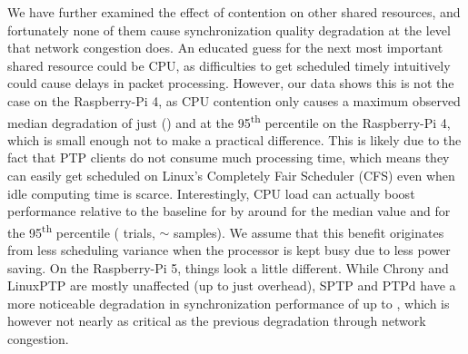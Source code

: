 We have  further examined the effect of contention on other shared resources, and fortunately none of them cause synchronization quality degradation at the level that network congestion does.
An educated guess for the next most important shared resource could be CPU, as difficulties to get scheduled timely intuitively could cause delays in packet processing.
However, our data shows this is not the case on the Raspberry-Pi 4, as CPU contention only causes a maximum observed median degradation of just \fRelative{\cmpMax} (\fVendor{\cmpMaxArg}) and \fRelative{\cmpMax} at the 95\textsuperscript{th} percentile on the Raspberry-Pi 4, which is small enough not to make a practical difference.
This is likely due to the fact that PTP clients do not consume much processing time, which means they can easily get scheduled on Linux's Completely Fair Scheduler (CFS) even when idle computing time is scarce.
Interestingly, CPU load can actually boost performance relative to the baseline for \fVendor{\cmpMinArg} by around \fRelativeInverted{\cmpMin} for the median value and \fRelativeInverted{\cmpMin} for the 95\textsuperscript{th} percentile ( trials, $\sim$ samples).
%
%
We assume that this benefit originates from less scheduling variance when the processor is kept busy due to less power saving.
%
%
On the Raspberry-Pi 5, things look a little different. While Chrony and LinuxPTP are mostly unaffected (up to just \fRelative{\cmpMax} overhead),
%
%
SPTP and PTPd have a more noticeable degradation in synchronization performance of up to \fRatio[1]{\cmpMax}, which is however not nearly as critical as the previous degradation through network congestion.

